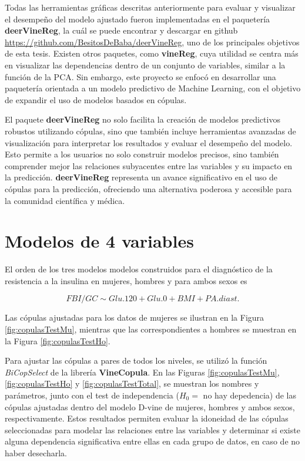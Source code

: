 \vspace{-0.3cm}
Todas las herramientas gráficas descritas anteriormente para evaluar y visualizar el desempeño del modelo ajustado fueron implementadas en el paquetería \textbf{deerVineReg}, la cuál se puede encontrar y descargar en github \url{https://github.com/BesitosDeBaba/deerVineReg}, uno de los principales objetivos de esta tesis. Existen otros paquetes, como \textbf{vineReg}, cuya utilidad se centra más en visualizar las dependencias dentro de un conjunto de variables, similar a la función de la PCA. Sin embargo, este proyecto se enfocó en desarrollar una paquetería orientada a un modelo predictivo de Machine Learning, con el objetivo de expandir el uso de modelos basados en cópulas.

El paquete \textbf{deerVineReg} no solo facilita la creación de modelos predictivos robustos utilizando cópulas, sino que también incluye herramientas avanzadas de visualización para interpretar los resultados y evaluar el desempeño del modelo. Esto permite a los usuarios no solo construir modelos precisos, sino también comprender mejor las relaciones subyacentes entre las variables y su impacto en la predicción. \textbf{deerVineReg} representa un avance significativo en el uso de cópulas para la predicción, ofreciendo una alternativa poderosa y accesible para la comunidad científica y médica.

\section{Modelos de 4 variables}

El orden de los tres modelos modelos construidos para el diagnóstico de la resistencia a la insulina en mujeres, hombres y para ambos sexos es

\vspace{-0.5cm}
\begin{equation}\label{ordenVar4}
     FBI/GC \sim Glu.120 + Glu.0 + BMI + PA.diast.
\end{equation}

Las cópulas ajustadas para los datos de mujeres se ilustran en la Figura \ref{fig:copulasTestMu}, mientras que las correspondientes a hombres se muestran en la Figura \ref{fig:copulasTestHo}.


Para ajustar las cópulas a pares de todos los niveles, se utilizó la función \textit{BiCopSelect} de la librería \textbf{VineCopula}. En las Figuras  \ref{fig:copulasTestMu}, \ref{fig:copulasTestHo} y \ref{fig:copulasTestTotal}, se muestran los nombres y parámetros, junto con el test de independencia ($H_0 =$ no hay depedencia) de las cópulas ajustadas dentro del modelo D-vine de mujeres, hombres y ambos sexos, respectivamente. Estos resultados permiten evaluar la idoneidad de las cópulas seleccionadas para modelar las relaciones entre las variables y determinar si existe alguna dependencia significativa entre ellas en cada grupo de datos, en caso de no haber desecharla. 

